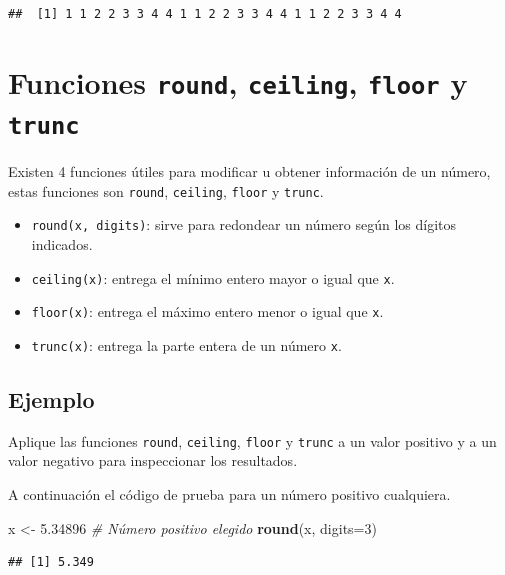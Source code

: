 \documentclass[10pt,]{krantz}
\makeatletter
\newenvironment{Shaded}{\begin{snugshade}}{\end{snugshade}}
\newcommand{\KeywordTok}[1]{\textcolor[rgb]{0.13,0.29,0.53}{\textbf{{#1}}}}
\newcommand{\DataTypeTok}[1]{\textcolor[rgb]{0.13,0.29,0.53}{{#1}}}
\newcommand{\DecValTok}[1]{\textcolor[rgb]{0.00,0.00,0.81}{{#1}}}
\newcommand{\FloatTok}[1]{\textcolor[rgb]{0.00,0.00,0.81}{{#1}}}
\newcommand{\StringTok}[1]{\textcolor[rgb]{0.31,0.60,0.02}{{#1}}}
\newcommand{\CommentTok}[1]{\textcolor[rgb]{0.56,0.35,0.01}{\textit{{#1}}}}
\newcommand{\NormalTok}[1]{{#1}}
\providecommand{\tightlist}{%
  \setlength{\itemsep}{0pt}\setlength{\parskip}{0pt}}
\newenvironment{kframe}{%
\medskip{}
\setlength{\fboxsep}{.8em}
 \def\at@end@of@kframe{}%
 \ifinner\ifhmode%
  \def\at@end@of@kframe{\end{minipage}}%
  \begin{minipage}{\columnwidth}%
 \fi\fi%
 \def\FrameCommand##1{\hskip\@totalleftmargin \hskip-\fboxsep
 \colorbox{shadecolor}{##1}\hskip-\fboxsep
     \hskip-\linewidth \hskip-\@totalleftmargin \hskip\columnwidth}%
 \MakeFramed {\advance\hsize-\width
   \@totalleftmargin\z@ \linewidth\hsize
   \@setminipage}}%
 {\par\unskip\endMakeFramed%
 \at@end@of@kframe}
\renewenvironment{Shaded}{\begin{kframe}}{\end{kframe}}
\makeatother
\begin{document}
\begin{verbatim}
##  [1] 1 1 2 2 3 3 4 4 1 1 2 2 3 3 4 4 1 1 2 2 3 3 4 4
\end{verbatim}

\section{\texorpdfstring{Funciones \texttt{round}, \texttt{ceiling},
\texttt{floor} y \texttt{trunc}  
}{Funciones round, ceiling, floor y trunc    }}\label{funciones-round-ceiling-floor-y-trunc}

Existen 4 funciones útiles para modificar u obtener información de un
número, estas funciones son \texttt{round}, \texttt{ceiling},
\texttt{floor} y \texttt{trunc}.

\begin{itemize}
\tightlist
\item
  \texttt{round(x,\ digits)}: sirve para redondear un número según los
  dígitos indicados.
\item
  \texttt{ceiling(x)}: entrega el mínimo entero mayor o igual que
  \texttt{x}.
\item
  \texttt{floor(x)}: entrega el máximo entero menor o igual que
  \texttt{x}.
\item
  \texttt{trunc(x)}: entrega la parte entera de un número \texttt{x}.
\end{itemize}

\subsection*{Ejemplo}\label{ejemplo-13}


Aplique las funciones \texttt{round}, \texttt{ceiling}, \texttt{floor} y
\texttt{trunc} a un valor positivo y a un valor negativo para
inspeccionar los resultados.

A continuación el código de prueba para un número positivo cualquiera.

\begin{Shaded}
\begin{Highlighting}[]
\NormalTok{x <-}\StringTok{ }\FloatTok{5.34896}  \CommentTok{# Número positivo elegido}
\KeywordTok{round}\NormalTok{(x, }\DataTypeTok{digits=}\DecValTok{3}\NormalTok{)}
\end{Highlighting}
\end{Shaded}

\begin{verbatim}
## [1] 5.349
\end{verbatim}
\end{document}

